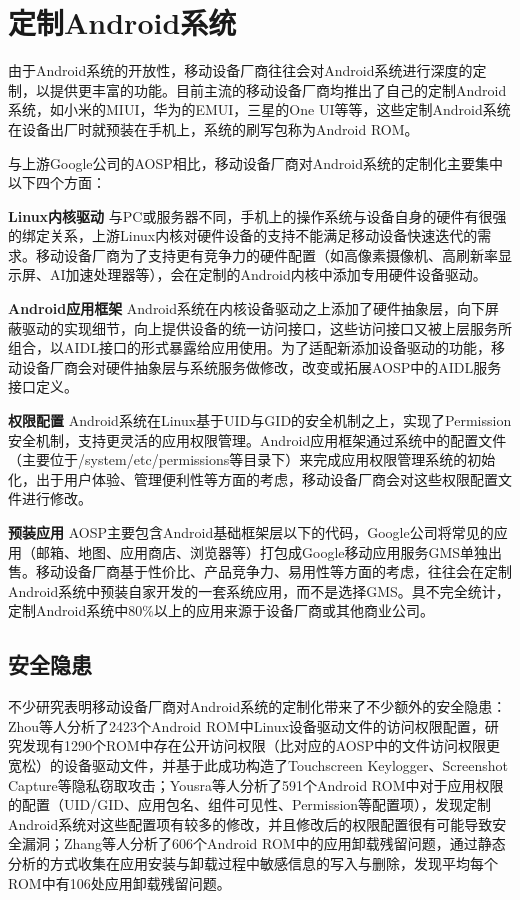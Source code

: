 \documentclass[winfonts,master,twoside]{njuthesis}
\begin{document}
\section{定制Android系统}

由于Android系统的开放性，移动设备厂商往往会对Android系统进行深度的定制，以提供更丰富的功能。目前主流的移动设备厂商均推出了自己的定制Android系统，如小米的MIUI，华为的EMUI，三星的One UI等等，这些定制Android系统在设备出厂时就预装在手机上，系统的刷写包称为Android ROM。

与上游Google公司的AOSP相比，移动设备厂商对Android系统的定制化主要集中以下四个方面：

\textbf{Linux内核驱动} \quad 与PC或服务器不同，手机上的操作系统与设备自身的硬件有很强的绑定关系，上游Linux内核对硬件设备的支持不能满足移动设备快速迭代的需求。移动设备厂商为了支持更有竞争力的硬件配置（如高像素摄像机、高刷新率显示屏、AI加速处理器等），会在定制的Android内核中添加专用硬件设备驱动。

\textbf{Android应用框架} \quad Android系统在内核设备驱动之上添加了硬件抽象层，向下屏蔽驱动的实现细节，向上提供设备的统一访问接口，这些访问接口又被上层服务所组合，以AIDL接口的形式暴露给应用使用。为了适配新添加设备驱动的功能，移动设备厂商会对硬件抽象层与系统服务做修改，改变或拓展AOSP中的AIDL服务接口定义。

\textbf{权限配置} \quad Android系统在Linux基于UID与GID的安全机制之上，实现了Permission安全机制，支持更灵活的应用权限管理。Android应用框架通过系统中的配置文件（主要位于/system/etc/permissions等目录下）来完成应用权限管理系统的初始化，出于用户体验、管理便利性等方面的考虑，移动设备厂商会对这些权限配置文件进行修改。

\textbf{预装应用} \quad AOSP主要包含Android基础框架层以下的代码，Google公司将常见的应用（邮箱、地图、应用商店、浏览器等）打包成Google移动应用服务GMS单独出售。移动设备厂商基于性价比、产品竞争力、易用性等方面的考虑，往往会在定制Android系统中预装自家开发的一套系统应用，而不是选择GMS。具不完全统计\cite{gamba2020analysis}，定制Android系统中80\%以上的应用来源于设备厂商或其他商业公司。


\subsection{安全隐患}

不少研究表明移动设备厂商对Android系统的定制化带来了不少额外的安全隐患：Zhou等人分析了2423个Android ROM中Linux设备驱动文件的访问权限配置，研究发现有1290个ROM中存在公开访问权限（比对应的AOSP中的文件访问权限更宽松）的设备驱动文件，并基于此成功构造了Touchscreen Keylogger、Screenshot Capture等隐私窃取攻击\cite{zhou2014peril}；Yousra等人分析了591个Android ROM中对于应用权限的配置（UID/GID、应用包名、组件可见性、Permission等配置项），发现定制Android系统对这些配置项有较多的修改，并且修改后的权限配置很有可能导致安全漏洞\cite{aafer2016harvesting}；Zhang等人分析了606个Android ROM中的应用卸载残留问题，通过静态分析的方式收集在应用安装与卸载过程中敏感信息的写入与删除，发现平均每个ROM中有106处应用卸载残留问题\cite{zhang2016hey}。
\end{document}
